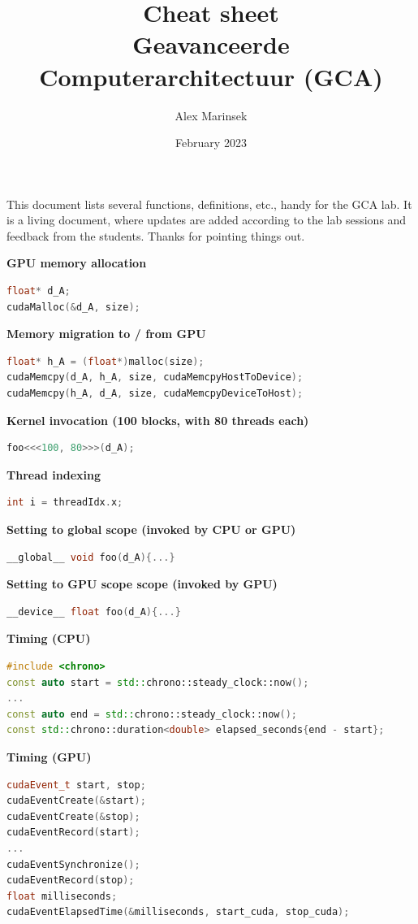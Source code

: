 \documentclass{article}
\title{Cheat sheet \\ \vspace{2mm}\footnotesize{Geavanceerde Computerarchitectuur (GCA)}}
\author{Alex Marinsek}
\date{February 2023}
\begin{document}
 

\maketitle

\vspace{2cm}

This document lists several functions, definitions, etc., handy for the GCA lab. It is a living document, where updates are added according to the lab sessions and feedback from the students. Thanks for pointing things out.


\textbf{GPU memory allocation}
\begin{lstlisting}[language=C++]
float* d_A;
cudaMalloc(&d_A, size);
\end{lstlisting}


\textbf{Memory migration to / from GPU}
\begin{lstlisting}[language=C++]
float* h_A = (float*)malloc(size);
cudaMemcpy(d_A, h_A, size, cudaMemcpyHostToDevice);
cudaMemcpy(h_A, d_A, size, cudaMemcpyDeviceToHost);
\end{lstlisting}


\textbf{Kernel invocation (100 blocks, with 80 threads each)}
\begin{lstlisting}[language=C++]
foo<<<100, 80>>>(d_A);
\end{lstlisting}


\textbf{Thread indexing}
\begin{lstlisting}[language=C++]
int i = threadIdx.x;
\end{lstlisting}


\textbf{Setting to global scope (invoked by CPU or GPU)}
\begin{lstlisting}[language=C++]
__global__ void foo(d_A){...}
\end{lstlisting}


\textbf{Setting to GPU scope scope (invoked by GPU)}
\begin{lstlisting}[language=C++]
__device__ float foo(d_A){...}
\end{lstlisting}


\textbf{Timing (CPU)}
\begin{lstlisting}[language=C++]
#include <chrono>
const auto start = std::chrono::steady_clock::now();
...
const auto end = std::chrono::steady_clock::now();
const std::chrono::duration<double> elapsed_seconds{end - start};
\end{lstlisting}


\textbf{Timing (GPU)}
\begin{lstlisting}[language=C++]
cudaEvent_t start, stop;
cudaEventCreate(&start);
cudaEventCreate(&stop);
cudaEventRecord(start);
...
cudaEventSynchronize();
cudaEventRecord(stop);
float milliseconds;
cudaEventElapsedTime(&milliseconds, start_cuda, stop_cuda);
\end{lstlisting}
\end{document}
